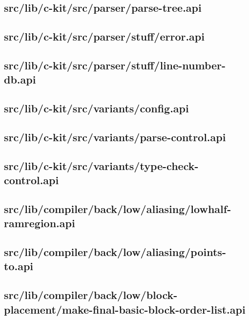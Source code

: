 \subsection{src/lib/c-kit/src/parser/parse-tree.api}


\subsection{src/lib/c-kit/src/parser/stuff/error.api}


\subsection{src/lib/c-kit/src/parser/stuff/line-number-db.api}


\subsection{src/lib/c-kit/src/variants/config.api}


\subsection{src/lib/c-kit/src/variants/parse-control.api}


\subsection{src/lib/c-kit/src/variants/type-check-control.api}


\subsection{src/lib/compiler/back/low/aliasing/lowhalf-ramregion.api}


\subsection{src/lib/compiler/back/low/aliasing/points-to.api}


\subsection{src/lib/compiler/back/low/block-placement/make-final-basic-block-order-list.api}


